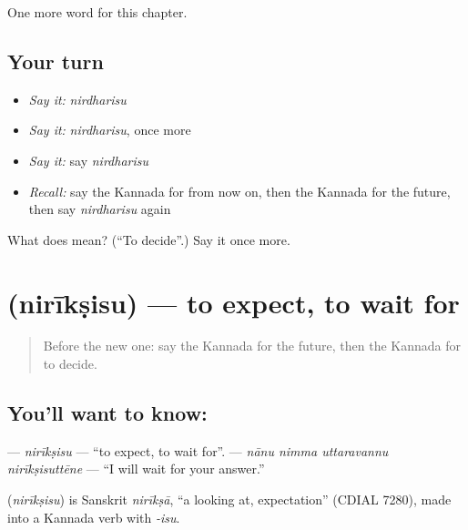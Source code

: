 \begin{grammarlens}[title={What you've built}]
One more word for this chapter.
\end{grammarlens}

\subsection*{Your turn}
\begin{itemize}
\raggedright
  \item \emph{Say it:} \emph{nirdharisu}
  \item \emph{Say it:} \emph{nirdharisu}, once more
  \item \emph{Say it:} say \emph{nirdharisu}
  \item \emph{Recall:} say the Kannada for from now on, then the Kannada for the future, then say \emph{nirdharisu} again
\end{itemize}

\begin{tcolorbox}[breakable,colback=teal!4,colframe=teal!35!black,title={Before you move on}]
What does  mean? (\textquotedblleft{}To decide\textquotedblright{}.) Say it once more.
\end{tcolorbox}
\section[\texorpdfstring{\kn{ನಿರೀಕ್ಷಿಸು} (nirīkṣisu)}{ನಿರೀಕ್ಷಿಸು (nirīkṣisu)}]{ (nirīkṣisu) — to expect, to wait for}

\label{lesson:KA-C156-nirikshisu}



\begin{quote}
Before the new one: say the Kannada for the future, then the Kannada for to decide.
\end{quote}

\subsection*{You'll want to know: }
\textbf{} — \emph{nirīkṣisu} — \textquotedblleft{}to expect, to wait for\textquotedblright{}. \textbf{   } — \emph{nānu nimma uttaravannu nirīkṣisuttēne} — \textquotedblleft{}I will wait for your answer.\textquotedblright{}

\begin{cousinweb}
\textbf{} (\emph{nirīkṣisu}) is Sanskrit \emph{nirīkṣā}, \textquotedblleft{}a looking at, expectation\textquotedblright{} (CDIAL 7280), made into a Kannada verb with \emph{-isu}.
\end{cousinweb}

